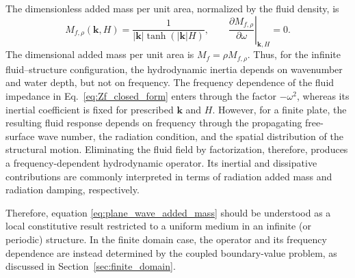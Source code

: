 \begin{remark}
The dimensionless added mass per unit area, normalized by the fluid density, is
\begin{equation}
    M_{f,\rho}(\mathbf{k},H)
    =
    \frac{1}{|\mathbf{k}|\tanh(|\mathbf{k}|H)},
    \qquad
    \left.
    \frac{\partial M_{f,\rho}}{\partial\omega}
    \right|_{\mathbf{k},H}
    =0.
    \label{eq:plane_wave_added_mass}
\end{equation}
The dimensional added mass per unit area is
$M_f=\rho M_{f,\rho}$. Thus, for the infinite fluid--structure configuration, the hydrodynamic inertia depends on wavenumber and water depth, but not on frequency. The frequency dependence of the
fluid impedance in Eq.~\eqref{eq:Zf_closed_form} enters
through the factor $-\omega^2$, whereas its inertial coefficient is fixed for prescribed $\mathbf{k}$ and $H$.
%
However, for a finite plate, the resulting fluid response depends on frequency through the propagating free-surface wave number, the radiation condition, and the spatial distribution of the structural motion. Eliminating the fluid field by factorization,
therefore, produces a frequency-dependent hydrodynamic operator.
Its inertial and dissipative contributions are commonly interpreted in terms of radiation added mass and radiation damping, respectively.

Therefore, equation \eqref{eq:plane_wave_added_mass} should be understood as a local constitutive result restricted to a uniform medium in an infinite (or periodic) structure. In the finite domain case, the operator and its frequency dependence are instead
determined by the coupled boundary-value problem, as discussed in
Section~\ref{sec:finite_domain}.
\end{remark}

